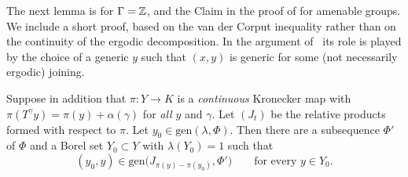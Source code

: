 The next lemma is \cite[Lemma~3.18]{kra2022infinite} for $\Gamma=\mathbb{Z}$, and the Claim in the
proof of \cite[Theorem~4.10]{charamaras2024finding} for amenable groups. We include a short
proof, based on the van der Corput inequality rather than on the continuity of the ergodic
decomposition. In the argument of~\cite{kra2026short} its role is played by the choice of a
generic $y$ such that $(x,y)$ is generic for some (not necessarily ergodic) joining.

\begin{lemma}\label{K:lem:pairs}
Suppose in addition that $\pi\colon Y\to K$ is a \emph{continuous} Kronecker map with
$\pi(T^\gamma y)=\pi(y)+\alpha(\gamma)$ for \emph{all} $y$ and $\gamma$. Let $(J_t)$ be the
relative products formed with respect to $\pi$.
Let $y_0\in\mathrm{gen}(\lambda,\Phi)$.
Then there are a subsequence $\Phi'$ of $\Phi$ and a Borel set $Y_0\subset Y$ with
$\lambda(Y_0)=1$ such that
\[
(y_0,y)\in\mathrm{gen}\big(J_{\pi(y)-\pi(y_0)},\Phi'\big)\qquad\text{for every }y\in Y_0 .
\]
\end{lemma}

